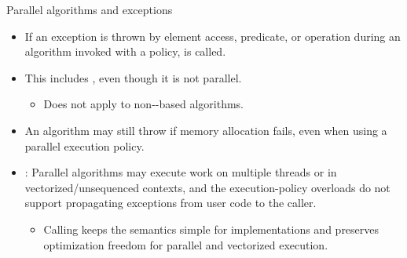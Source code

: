 \begin{frame}[t,fragile]{Parallel algorithms and exceptions}
\begin{itemize}
  \item If an exception is thrown by element access, predicate, or operation during an algorithm invoked with a  policy,  is called.

  \item This includes , even though it is not parallel.
    \begin{itemize}
      \item Does not apply to non--based algorithms.
    \end{itemize}

  \item An algorithm may still throw  if memory allocation fails, even when using a parallel execution policy.
  \item {}: Parallel algorithms may execute work on multiple threads or in vectorized/unsequenced contexts, and the execution-policy overloads do not support propagating exceptions from user code to the caller.
    \begin{itemize}
      \item Calling  keeps the semantics simple for implementations and preserves optimization freedom for parallel and vectorized execution.
    \end{itemize}
\end{itemize}
\end{frame}